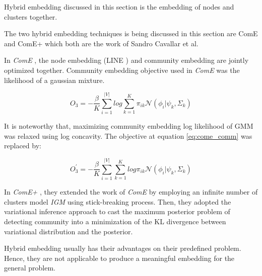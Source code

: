Hybrid embedding discussed in this section is the embedding of nodes and clusters together.

The two hybrid embedding techniques is being discussed in this section are ComE  and ComE+  which both are the work of Sandro Cavallar et al.

In \emph{ComE} \cite{cavallari2017learning}, the node embedding (LINE \cite{tang2015line}) and community embedding are jointly optimized together. Community embedding objective used in \emph{ComE} was the likelihood of a gaussian mixture.

\begin{equation}
    O_3 = -\frac{\beta}{K} \sum_{i=1}^{|V|} log \sum_{k=1}^{K} \pi_{ik} \mathcal{N}(\phi_i | \psi_k, \Sigma_k)
    \label{eq:come_comm}
\end{equation}

It is noteworthy that, maximizing community embedding log likelihood of GMM was relaxed using log concavity. The objective at equation \ref{eq:come_comm} was replaced by:

\begin{equation}
    O_3^{'} = -\frac{\beta}{K} \sum_{i=1}^{|V|} \sum_{k=1}^{K} log \pi_{ik} \mathcal{N}(\phi_i | \psi_k, \Sigma_k)
\end{equation}


In \emph{ComE+} \cite{cavallari2019embedding}, they extended the work of \emph{ComE} by employing an infinite number of clusters model \emph{IGM} \cite{rasmussen2000infinite} using stick-breaking process. Then, they adopted the variational inference approach \cite{blei2006variational} to cast the maximum posterior problem of detecting community into a minimization of the KL divergence between variational distribution and the posterior.

Hybrid embedding usually has their advantages on their predefined problem. Hence, they are not applicable to produce a meaningful embedding for the general problem. \cite{grover2016node2vec}